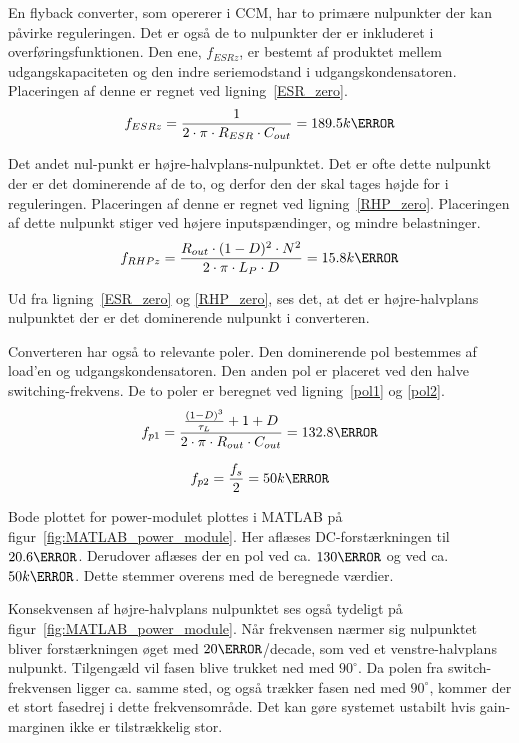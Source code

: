 En flyback converter, som opererer i CCM, har to primære nulpunkter der kan påvirke reguleringen. Det er også de to nulpunkter der er inkluderet i overføringsfunktionen. Den ene, $f_{ESRz}$, er bestemt af produktet mellem udgangskapaciteten og den indre seriemodstand i udgangskondensatoren. Placeringen af denne er regnet ved ligning~\ref{ESR_zero}.
\begin{equation} \label{ESR_zero}
f_{ESRz} = \frac{1}{2 \cdot \pi \cdot R_{ESR} \cdot C_{out}} = 189.5k\hertz
\end{equation}

Det andet nul-punkt er højre-halvplans-nulpunktet. Det er ofte dette nulpunkt der er det dominerende af de to, og derfor den der skal tages højde for i reguleringen. Placeringen af denne er regnet ved ligning~\ref{RHP_zero}. Placeringen af dette nulpunkt stiger ved højere inputspændinger, og mindre belastninger. 
\begin{equation} \label{RHP_zero}
f_{RHPz} = \frac{R_{out} \cdot (1-D)^2 \cdot N^2}{2 \cdot \pi \cdot L_P \cdot D} = 15.8k\hertz
\end{equation}

\noindent Ud fra ligning~\ref{ESR_zero} og \ref{RHP_zero}, ses det, at det er højre-halvplans nulpunktet der er det dominerende nulpunkt i converteren. 

Converteren har også to relevante poler. Den dominerende pol bestemmes af load'en og udgangskondensatoren. Den anden pol er placeret ved den halve switching-frekvens. De to poler er beregnet ved ligning~\ref{pol1} og \ref{pol2}.
\begin{equation} \label{pol1}
f_{p1} = \frac{\frac{(1-D)^3}{\tau_L} + 1 + D}{2\cdot \pi \cdot R_{out} \cdot C_{out}} = 132.8\hertz
\end{equation}

\begin{equation} \label{pol2}
f_{p2} = \frac{f_s}{2} = 50k\hertz
\end{equation}

\noindent Bode plottet for power-modulet plottes i MATLAB på figur~\ref{fig:MATLAB_power_module}. Her aflæses DC-forstærkningen til $20.6\decibel$. Derudover aflæses der en pol ved ca. $130\hertz$ og ved ca. $50k\hertz$. Dette stemmer overens med de beregnede værdier.

Konsekvensen af højre-halvplans nulpunktet ses også tydeligt på figur~\ref{fig:MATLAB_power_module}. Når frekvensen nærmer sig nulpunktet bliver forstærkningen øget med $20 \decibel$/decade, som ved et venstre-halvplans nulpunkt. Tilgengæld vil fasen blive trukket ned med $90^\circ$. Da polen fra switch-frekvensen ligger ca. samme sted, og også trækker fasen ned med $90^\circ$, kommer der et stort fasedrej i dette frekvensområde. Det kan gøre systemet ustabilt hvis gain-marginen ikke er tilstrækkelig stor. 

